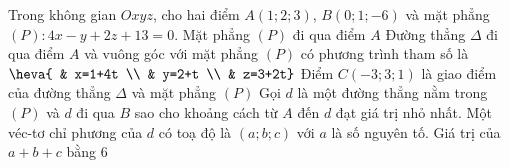 \begin{ex}%
	 Trong không gian $Oxyz$, cho hai điểm $A(1; 2; 3)$, $B(0; 1;-6)$ và mặt phẳng $(P): 4 x-y+2 z+13=0$.
	 \choiceTF
		 {Mặt phẳng $(P)$ đi qua điểm $A$}
		{Đường thẳng $\Delta$ đi qua điểm $A$ và vuông góc với mặt phẳng $(P)$ có phương trình tham số là  $\heva{
		& x=1+4t \\ 
		&  y=2+t \\
		& z=3+2t}$} 
		{\True Điểm $C(-3; 3; 1)$ là giao điểm của  đường thẳng $\Delta$ và mặt phẳng $(P)$}
		{Gọi $d$ là một đường thẳng nằm trong $(P)$ và $d$ đi qua $B$ sao cho khoảng cách từ $A$ đến  $d$ đạt giá trị nhỏ nhất. Một véc-tơ chỉ phương của $d$ có toạ độ là $(a;b;c)$ với $a$ là số nguyên tố. Giá trị của $a+b+c$ bằng $6$}
\end{ex}



